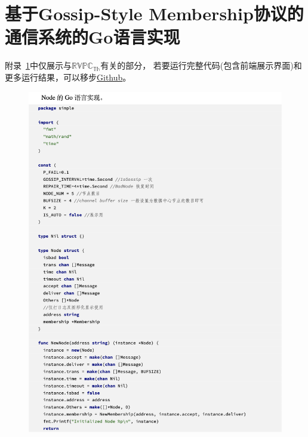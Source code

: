 \chapter{基于Gossip-Style Membership协议的通信系统的Go语言实现}\label{app:code}
附录~\ref{app:code}中仅展示与$\mathbb{RVPC}_{\mathbb{Th}}$有关的部分，
若要运行完整代码(包含前端展示界面)和更多运行结果，可以移步\href{https://github.com/Angeladadd/AGossipStyleMembershipProtocolImplementedUsingRVPC}{Github}。
\begin{figure}[!htbp]
    \small
    \centering
    \includegraphics[width=14cm]{../figures/code/1.png}
 \end{figure}
